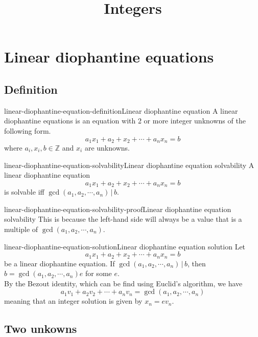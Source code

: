 \documentclass[preview]{standalone}
\newcommand{\divides}{\,|\,}
\begin{document}
\title{Integers}
\genpage

\section{Linear diophantine equations}

\subsection{Definition}

\begin{snippetdefinition}{linear-diophantine-equation-definition}{Linear diophantine equation}
    A linear diophantine equations is an equation with 2 or more integer unknowns of the following form.
    \[
        a_1x_1 + a_2+x_2 + \cdots + a_nx_n = b
    \]
    where \(a_i,x_i,b \in \mathbb{Z}\) and \(x_i\) are unknowns.
\end{snippetdefinition}

\begin{snippetproposition}{linear-diophantine-equation-solvability}{Linear diophantine equation solvability}
    A linear diophantine equation
    \[
        a_1x_1 + a_2+x_2 + \cdots + a_nx_n = b
    \]
    is solvable iff \(\gcd(a_1,a_2,\cdots,a_n) \divides b\).
\end{snippetproposition}

\begin{snippetproof}{linear-diophantine-equation-solvability-proof}{Linear diophantine equation solvability}
    This is because the left-hand side will always be a value that is a multiple
    of \(\gcd(a_1,a_2,\cdots,a_n)\).
\end{snippetproof}

\begin{snippetproposition}{linear-diophantine-equation-solution}{Linear diophantine equation solution}
    Let
    \[
        a_1x_1 + a_2+x_2 + \cdots + a_nx_n = b
    \]
    be a linear diophantine equation.
    If \(\gcd(a_1,a_2,\cdots,a_n) \divides b\),
    then \(b = \gcd(a_1,a_2,\cdots,a_n)e\) for some \(e\). \\
    By the Bezout identity, which can be find using Euclid's algorithm, we have
    \[a_1v_1+a_2v_2+\cdots+a_nv_n=\gcd(a_1,a_2,\cdots,a_n)\]
    meaning that an integer solution is given by \(x_n=ev_n\).
\end{snippetproposition}

\subsection{Two unkowns}
\end{document}

